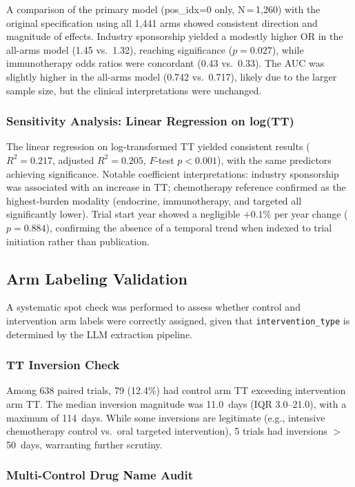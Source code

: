 \documentclass[11pt,a4paper]{article}
\begin{document}
A comparison of the primary model (pos\_idx=0 only, N\,=\,1{,}260) with the original specification using all 1{,}441 arms showed consistent direction and magnitude of effects. Industry sponsorship yielded a modestly higher OR in the all-arms model (1.45 vs.\ 1.32), reaching significance ($p=0.027$), while immunotherapy odds ratios were concordant (0.43 vs.\ 0.33). The AUC was slightly higher in the all-arms model (0.742 vs.\ 0.717), likely due to the larger sample size, but the clinical interpretations were unchanged.

\subsubsection{Sensitivity Analysis: Linear Regression on log(TT)}

The linear regression on log-transformed TT yielded consistent results ($R^2=0.217$, adjusted $R^2=0.205$, $F$-test $p<0.001$), with the same predictors achieving significance. Notable coefficient interpretations: industry sponsorship was associated with an increase in TT; chemotherapy reference confirmed as the highest-burden modality (endocrine, immunotherapy, and targeted all significantly lower). Trial start year showed a negligible $+0.1\%$ per year change ($p=0.884$), confirming the absence of a temporal trend when indexed to trial initiation rather than publication.

\subsection{Arm Labeling Validation}

A systematic spot check was performed to assess whether control and intervention arm labels were correctly assigned, given that \texttt{intervention\_type} is determined by the LLM extraction pipeline.

\subsubsection{TT Inversion Check}

Among 638 paired trials, 79 (12.4\%) had control arm TT exceeding intervention arm TT. The median inversion magnitude was 11.0~days (IQR 3.0--21.0), with a maximum of 114~days. While some inversions are legitimate (e.g., intensive chemotherapy control vs.\ oral targeted intervention), 5 trials had inversions $>$50~days, warranting further scrutiny.

\subsubsection{Multi-Control Drug Name Audit}
\end{document}
